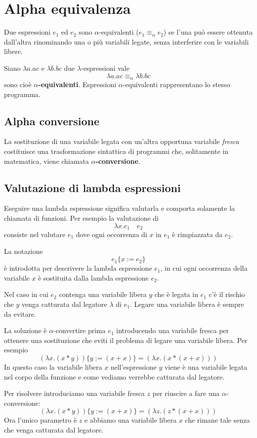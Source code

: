 \section{Alpha equivalenza}
Due espressioni $e_1$ ed $e_2$ sono $\alpha$-equivalenti ($e_1 \equiv_\alpha e_2$) se l'una può essere ottenuta
dall'altra rinominando una o più variabili legate, senza interferire con le variabili libere.

Siano $\lambda a.ac$ e $\lambda b.bc$ due $\lambda$-espressioni vale
\[ \lambda a.ac \equiv_\alpha \lambda b.bc \]
sono cioè \textbf{$\alpha$-equivalenti}. Espressioni $\alpha$-equivalenti rappresentano lo stesso programma.

\subsection{Alpha conversione}
La sostituzione di una variabile legata con un'altra opportuna variabile \emph{fresca} costituisce una
trasformazione sintattica di programmi che, solitamente in matematica, viene chiamata \textbf{$\alpha$-conversione}.

\subsection{Valutazione di lambda espressioni}
Eseguire una lambda espressione significa valutarla e comporta solamente la chiamata di funzioni. Per esempio la
valutazione di
\[ \lambda x.e_1 \quad e_2 \]
consiste nel valutare $e_1$ dove ogni occorrenza di $x$ in $e_1$ è rimpiazzata da $e_2$.

La notazione
\[ e_1 \{ x := e_2 \} \]
è introdotta per descrivere la lambda espressione $e_1$, in cui ogni occorrenza della variabile $x$ è sostituita
dalla lambda espressione $e_2$.

Nel caso in cui $e_2$ contenga una variabile libera $y$ che è legata in $e_1$ c'è il rischio che $y$ venga catturata
dal legatore $\lambda$ di $e_1$. Legare una variabile libera è sempre da evitare.

La soluzione è $\alpha$-convertire prima $e_1$ introducendo una variabile fresca per ottenere una sostituzione che
eviti il problema di legare una variabile libera. Per esempio
\[ (\lambda x.(x * y)) \{ y := (x + x) \} = (\lambda x.(x * (x + x))) \]
In questo caso la variabile libera $x$ nell'espressione $y$ viene è una variabile legata nel corpo della funzione
e come vediamo verrebbe catturata dal legatore.

Per risolvere introduciamo una variabile fresca $z$ per riuscire a fare una $\alpha$-conversione:
\[ (\lambda x.(x * y)) \{ y := (x + x) \} = (\lambda z.(z * (x + x))) \]
Ora l'unico parametro è $z$ e abbiamo una variabile libera $x$ che rimane tale senza che venga catturata dal
legatore.